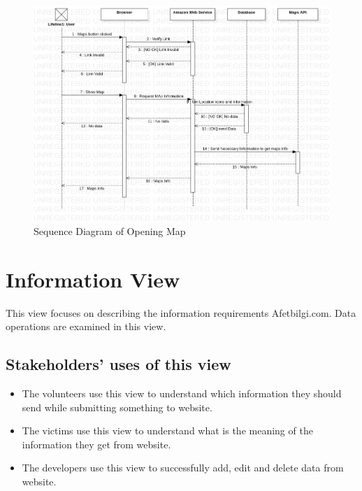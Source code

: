 \begin{figure}[H]
    \includegraphics[scale = 0.5]{assets/SequenceDiagramMaps.png}
    \caption[Sequence Diagram of Opening Map]{Sequence Diagram of Opening Map}
\end{figure}

\section{Information View}
This view focuses on describing the information requirements Afetbilgi.com. Data operations are examined in this view.

\subsection{Stakeholders' uses of this view}
\begin{itemize}
    \item The volunteers use this view to understand which information they should send while submitting something to website.
    \item The victims use this view to understand what is the meaning of the information they get from website.
    \item The developers use this view to successfully add, edit and delete data from website.
\end{itemize}

